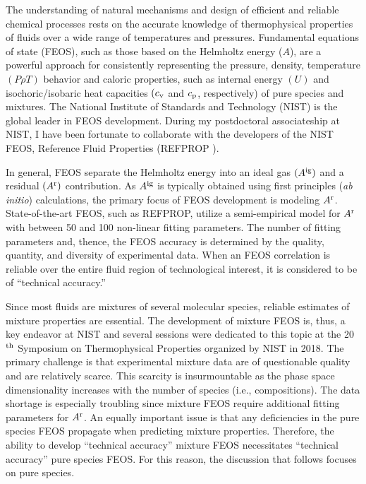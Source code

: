 \documentclass[12pt,a4paper]{article}
\begin{document}
The understanding of natural mechanisms and design of efficient and reliable chemical processes rests on the accurate knowledge of thermophysical properties of fluids over a wide range of temperatures and pressures. Fundamental equations of state (FEOS), such as those based on the Helmholtz energy ($A$), are a powerful approach for consistently representing the pressure, density, temperature $(P\rho T)$ behavior and caloric properties, such as internal energy $(U)$ and isochoric/isobaric heat capacities $(c_{\rm v}$ and $c_{\rm p}$, respectively) of pure species and mixtures. The National Institute of Standards and Technology (NIST) is the global leader in FEOS development. During my postdoctoral associateship at NIST, I have been fortunate to collaborate with the developers of the NIST FEOS, Reference Fluid Properties (REFPROP \cite{LEMMON-RP91}). 


In general, FEOS separate the Helmholtz energy into an ideal gas $(A^{\rm ig})$ and a residual $(A^{\rm r})$ contribution. As $A^{\rm ig}$ is typically obtained using first principles (\textit{ab initio}) calculations, the primary focus of FEOS development is modeling $A^{\rm r}$. State-of-the-art FEOS, such as REFPROP, utilize a semi-empirical model for $A^{\rm r}$ with between 50 and 100 non-linear fitting parameters. The number of fitting parameters and, thence, the FEOS accuracy is determined by the quality, quantity, and diversity of experimental data. When an FEOS correlation is reliable over the entire fluid region of technological interest, it is considered to be of ``technical accuracy.'' 

Since most fluids are mixtures of several molecular species, reliable estimates of mixture properties are essential. The development of mixture FEOS is, thus, a key endeavor at NIST and several sessions were dedicated to this topic at the 20$^{\rm th}$ Symposium on Thermophysical Properties organized by NIST in 2018. The primary challenge is that experimental mixture data are of questionable quality and are relatively scarce. This scarcity is insurmountable as the phase space dimensionality increases with the number of species (i.e., compositions). The data shortage is especially troubling since mixture FEOS require additional fitting parameters for $A^{\rm r}$. An equally important issue is that any deficiencies in the pure species FEOS propagate when predicting mixture properties. Therefore, the ability to develop ``technical accuracy'' mixture FEOS necessitates ``technical accuracy'' pure species FEOS. For this reason, the discussion that follows focuses on pure species. 
\end{document}
